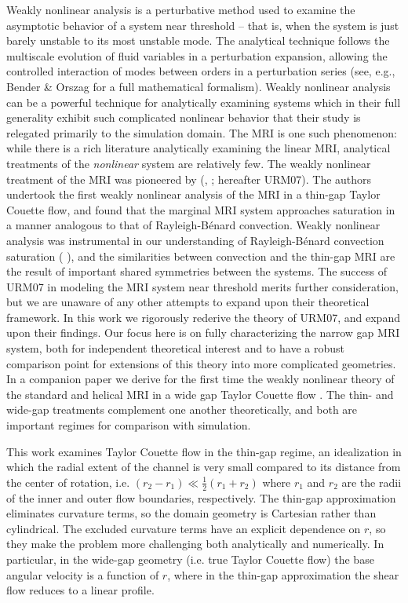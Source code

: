 \documentclass{emulateapj}
\newcommand{\citei}[1]{\citeauthor{#1} \citeyear{#1}}
\begin{document}
Weakly nonlinear analysis is a perturbative method used to examine the asymptotic behavior of a system near threshold -- that is, when the system is just barely unstable to its most unstable mode. The analytical technique follows the multiscale evolution of fluid variables in a perturbation expansion, allowing the controlled interaction of modes between orders in a perturbation series (see, e.g., Bender \& Orszag for a full mathematical formalism). Weakly nonlinear analysis can be a powerful technique for analytically examining systems which in their full generality exhibit such complicated nonlinear behavior that their study is relegated primarily to the simulation domain. The MRI is one such phenomenon: while there is a rich literature analytically examining the linear MRI, analytical treatments of the \textit{nonlinear} system are relatively few. The weakly nonlinear treatment of the MRI was pioneered by \citeauthor{Umurhan:2007dz} (\citeyear{Umurhan:2007dz}, \citeyear{Umurhan:2007hs}; hereafter URM07). The authors undertook the first weakly nonlinear analysis of the MRI in a thin-gap Taylor Couette flow, and found that the marginal MRI system approaches saturation in a manner analogous to that of Rayleigh-B\'enard convection. Weakly nonlinear analysis was instrumental in our understanding of Rayleigh-B\'enard convection saturation (\citei{Newell:1969}), and the similarities between convection and the thin-gap MRI are the result of important shared symmetries between the systems. The success of URM07 in modeling the MRI system near threshold merits further consideration, but we are unaware of any other attempts to expand upon their theoretical framework. In this work we rigorously rederive the theory of URM07, and expand upon their findings. Our focus here is on fully characterizing the narrow gap MRI system, both for independent theoretical interest and to have a robust comparison point for extensions of this theory into more complicated geometries. In a companion paper we derive for the first time the weakly nonlinear theory of the standard and helical MRI in a wide gap Taylor Couette flow \citep[][hereafter Paper II]{Clark:2016}. The thin- and wide-gap treatments complement one another theoretically, and both are important regimes for comparison with simulation. 

This work examines Taylor Couette flow in the thin-gap regime, an idealization in which the radial extent of the channel is very small compared to its distance from the center of rotation, i.e. $(r_2 - r_1) \ll \frac{1}{2} (r_1 + r_2)$ where $r_1$ and $r_2$ are the radii of the inner and outer flow boundaries, respectively. The thin-gap approximation eliminates curvature terms, so the domain geometry is Cartesian rather than cylindrical. The excluded curvature terms have an explicit dependence on $r$, so they make the problem more challenging both analytically and numerically. In particular, in the wide-gap geometry (i.e. true Taylor Couette flow) the base angular velocity is a function of $r$, where in the thin-gap approximation the shear flow reduces to a linear profile.
\end{document}

